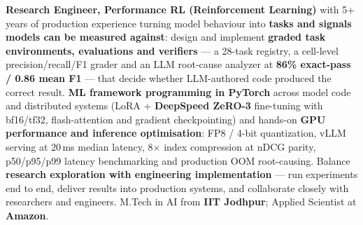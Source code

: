 \documentclass[letter,10pt]{article}
\begin{document}

\textbf{Research Engineer, Performance RL (Reinforcement Learning)} with 5+ years of production experience turning model behaviour into \textbf{tasks and signals models can be measured against}: design and implement \textbf{graded task environments, evaluations and verifiers} --- a 28-task registry, a cell-level precision/recall/F1 grader and an LLM root-cause analyzer at \textbf{86\% exact-pass / 0.86 mean F1} --- that decide whether LLM-authored code produced the correct result.
\textbf{ML framework programming in PyTorch} across model code and distributed systems (LoRA + \textbf{DeepSpeed ZeRO-3} fine-tuning with bf16/tf32, flash-attention and gradient checkpointing) and hands-on \textbf{GPU performance and inference optimisation}: FP8 / 4-bit quantization, vLLM serving at 20\,ms median latency, 8$\times$ index compression at nDCG parity, p50/p95/p99 latency benchmarking and production OOM root-causing.
Balance \textbf{research exploration with engineering implementation} --- run experiments end to end, deliver results into production systems, and collaborate closely with researchers and engineers.
M.Tech in AI from \textbf{IIT Jodhpur}; Applied Scientist at \textbf{Amazon}.
\end{document}
